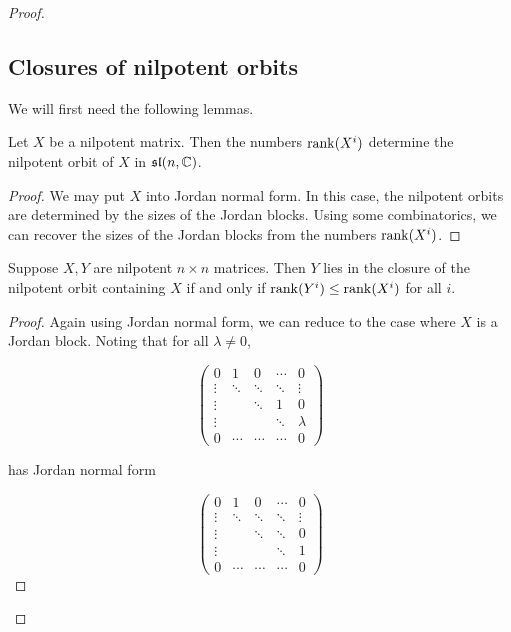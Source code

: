 \documentclass{report}
\renewcommand{\sl}{\mathfrak{sl}}
\begin{document}
\begin{proof}
    \subsection{Closures of nilpotent orbits}

    We will first need the following lemmas.

    \begin{lemma}
        Let \(X\) be a nilpotent matrix. Then the numbers \(\rank(X^i)\) determine the nilpotent orbit of \(X\) in \(\sl(n, \C)\).
    \end{lemma}

    \begin{proof}
        We may put \(X\) into Jordan normal form. In this case, the nilpotent orbits are determined by the sizes of the Jordan blocks. Using some combinatorics, we can recover the sizes of the Jordan blocks from the numbers \(\rank(X^i)\).
    \end{proof}

    \begin{lemma}
        Suppose \(X, Y\) are nilpotent \(n \times n\) matrices. Then \(Y\) lies in the closure of the nilpotent orbit containing \(X\) if and only if \(\rank(Y^i) \le \rank(X^i)\) for all \(i\).
    \end{lemma}

    \begin{proof}
        Again using Jordan normal form, we can reduce to the case where \(X\) is a Jordan block. Noting that for all \(\lambda \ne 0\),

        \[\begin{pmatrix}
            0 & 1 & 0 & \cdots  & 0 \\
            \vdots & \ddots & \ddots & \ddots & \vdots\\
            \vdots &  & \ddots & 1 & 0 \\
            \vdots &  &  & \ddots & \lambda \\
            0 & \cdots & \cdots & \cdots & 0
        \end{pmatrix}\]

        has Jordan normal form

        \[\begin{pmatrix}
            0 & 1 & 0 & \cdots  & 0 \\
            \vdots & \ddots & \ddots & \ddots & \vdots\\
            \vdots &  & \ddots & \ddots & 0 \\
            \vdots &  &  & \ddots & 1 \\
            0 & \cdots & \cdots & \cdots & 0
        \end{pmatrix}\]


\end{proof}
\end{proof}
\end{document}
